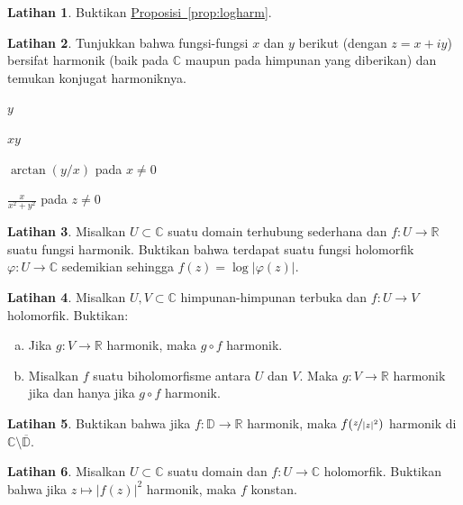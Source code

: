 \documentclass[12pt,openany]{book}
\newcommand{\sabs}[1]{\lvert {#1} \rvert}
\newcommand{\C}{{\mathbb{C}}}
\newcommand{\R}{{\mathbb{R}}}
\newcommand{\D}{{\mathbb{D}}}
\theoremstyle{plain}
\theoremstyle{remark}
\theoremstyle{definition}
\newenvironment{exbox}{%
    \def\FrameCommand{\vrule width 1pt \relax\hspace{10pt}}%
    \MakeFramed{\advance\hsize-\width\FrameRestore}%
}{%
    \endMakeFramed
}
\newenvironment{exparts}{%
    \leavevmode\begin{enumerate}[a),noitemsep,topsep=0pt,parsep=0pt,partopsep=0pt]
}{%
    \end{enumerate}
}
\newenvironment{expartshor}[1]{%
    \begingroup%
    \NumTabs{#1}%
    \leavevmode%
    \par%
    \begin{enumerate*}[a),itemjoin={\tab}]
}{%
    \end{enumerate*}\endgroup\par
}
\theoremstyle{exercise}
\newtheorem{exercise}{Latihan}[section]
\theoremstyle{example}
\newcommand{\propref}[1]{\hyperref[#1]{Proposisi~\ref*{#1}}}
\begin{document}
\begin{savenotes}
\begin{exbox}
\begin{exercise}
Buktikan \propref{prop:logharm}.
\end{exercise}

\begin{exercise}
Tunjukkan bahwa fungsi-fungsi $x$ dan $y$ berikut (dengan
$z = x+iy$) bersifat
harmonik (baik pada $\C$ maupun pada himpunan yang diberikan)
dan temukan konjugat harmoniknya.
\smallskip
\begin{expartshor}{5}
\item
$y$
\item
$xy$
\item
$\arctan(y/x)$ pada $x \neq 0$
\item
$\frac{x}{x^2+y^2}$ pada $z \neq 0$
\end{expartshor}
\end{exercise}

\begin{exercise}
Misalkan $U \subset \C$ suatu domain terhubung sederhana
dan $f \colon U \to \R$ suatu fungsi harmonik. Buktikan bahwa terdapat
suatu fungsi holomorfik $\varphi \colon U \to \C$ sedemikian sehingga
$f(z) = \log \sabs{\varphi(z)}$.
\end{exercise}

\begin{exercise}
Misalkan $U,V \subset \C$ himpunan-himpunan terbuka dan
$f \colon U \to V$ holomorfik. Buktikan:
\begin{exparts}
\item
Jika $g \colon V \to \R$ harmonik, maka
$g \circ f$ harmonik.
\item
Misalkan $f$ suatu biholomorfisme antara $U$ dan $V$.
Maka $g \colon V \to \R$ harmonik jika dan hanya jika
$g \circ f$ harmonik.
\end{exparts}
\end{exercise}

\begin{exercise}
Buktikan bahwa jika $f \colon \D \to \R$ harmonik, maka
$f(\nicefrac{z}{\sabs{z}^2})$ harmonik di $\C \setminus
\overline{\D}$.
\end{exercise}

\begin{exercise}
Misalkan $U \subset \C$ suatu domain dan
$f \colon U \to \C$ holomorfik. Buktikan bahwa
jika $z \mapsto \sabs{f(z)}^2$ harmonik, maka $f$ konstan.
\end{exercise}


\end{exbox}
\end{savenotes}
\end{document}
